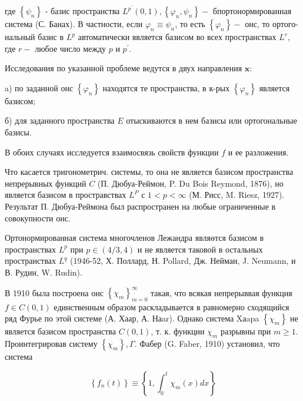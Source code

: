 \documentclass[10pt]{article}
\begin{document}
где $\left\{\psi_{n}\right\}$ - базис пространства $L^{p^{\prime}}(0,1),\left\{\varphi_{n}, \psi_{n}\right\}-$ бпортонормированная система (С. Банах). В частности, если $\varphi_{n} \equiv \psi_{n}$, то есть $\left\{\varphi_{n}\right\}-$ онс, то ортого- нальный базис в $L^{p}$ автоматически является базисом во всех пространствах $L^{r}$, где $r-$ любое число между $p$ и $p^{\prime}$.



Исследования по указанной проблеме ведутся в двух направления $\mathbf{x}:$



a) по заданной онс $\left\{\varphi_{n}\right\}$ находятся те пространства, в к-рых $\left\{\varphi_{n}\right\}$ является базисом;



б) для заданного пространства $E$ отыскиваются в нем базисы или ортогональные базисы.



В обоих случаях исследуется взаимосвязь свойств функции $f$ и ее разложения.



Что касается тригонометрич. системы, то она не является базисом пространства непрерывных функций $C$ (П. Дюбуа-Реймон, P. Du Bois Reymond, 1876), но является базисом в простравствах $L^{P}$ с $1<p<\infty$ (М. Рисс, M. Riesz, 1927). Результат П. Дюбуа-Реймона был распространен на любые ограниченные в совокупности онс.



Ортонормированная система многочленов Лежандра являөтся базисом в пространствах $L^{p}$ при $p \in(4 / 3,4)$ и не является таковой в остальных пространствах $L^{q}$ (1946-52, Х. Поллард, Н. Pollard, Дж. Нейман, J. Neumann, и В. Рудин, W. Rudin).



В 1910 была построена онс $\left\{\chi_{m}\right\}_{m=0}^{\infty}$ такая, что всякая непрерыввая функция $f \in C(0,1)$ единственным образом раскладывается в равномерно сходящийся ряд Фурье по этой системе (А. Хаар, А. Наar). Однако система Xаapa $\left\{\chi_{m}\right\}$ не является базисом пространства $C(0,1)$, т. к. функции $\chi_{m}$ разрывны при $m \geqslant 1$. Проинтегрировав систему $\left\{\chi_{m}\right\}, \Gamma$. Фабер (G. Faber, 1910) установил, что система



\[

\left\{f_{n}(t)\right\} \equiv\left\{1, \int_{0}^{t} \chi_{m}(x) d x\right\}

\]
\end{document}
